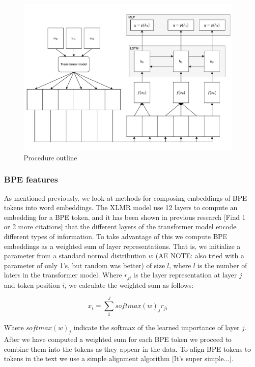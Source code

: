 \documentclass[11pt]{article}
\begin{document}
	\begin{figure}[h!]
		\centering
		\includegraphics[scale=0.5]{model-outline.pdf}
		\caption{\label{fig:model} Procedure outline}
	\end{figure}
	
	\subsubsection{BPE features}

            As mentioned previously, we look at methods for composing
     embeddings of BPE tokens into word embeddings. The XLMR model use
     12 layers to compute an embedding for a BPE token, and it has
     been shown in previous research \citep{kondratyukstraka,
     raganato2018analysis} [Find 1 or 2 more citations] that the
     different layers of the transformer model encode different types
     of information. To take advantage of this we compute BPE
     embeddings as a weighted sum of layer representations.  That is,
     we initialize a parameter from a standard normal distribution $w$
     (AE NOTE: also tried with a parameter of only 1's, but random was
     better) of size $l$, where $l$ is the number of laters in the
     transformer model. Where $r_{ji}$ is the layer representation at
     layer $j$ and token position $i$, we calculate the weighted sum
     as follows:

    \begin{equation}
		x_i = \sum_{1}^{J} softmax(w)_j r_{ji}
	\end{equation}

        Where $softmax(w)_j$ indicate the softmax of the learned
     importance of layer $j$. After we have computed a weighted sum for
     each BPE token we proceed to combine them into the tokens as they
     appear in the data. To align BPE tokens to tokens in the text we
     use a simple alignment algorithm [It's super simple...].
    
\end{document}
